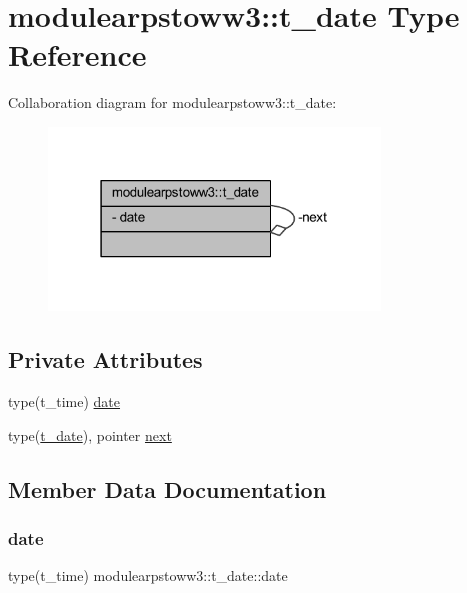\hypertarget{structmodulearpstoww3_1_1t__date}{}\section{modulearpstoww3\+:\+:t\+\_\+date Type Reference}
\label{structmodulearpstoww3_1_1t__date}


Collaboration diagram for modulearpstoww3\+:\+:t\+\_\+date\+:\nopagebreak
\begin{figure}[H]
\begin{center}
\leavevmode
\includegraphics[width=250pt]{structmodulearpstoww3_1_1t__date__coll__graph}
\end{center}
\end{figure}
\subsection*{Private Attributes}
\begin{DoxyCompactItemize}
\item 
type(t\+\_\+time) \mbox{\hyperlink{structmodulearpstoww3_1_1t__date_ac142c7c386935a83f8d28a473ccb10b4}{date}}
\item 
type(\mbox{\hyperlink{structmodulearpstoww3_1_1t__date}{t\+\_\+date}}), pointer \mbox{\hyperlink{structmodulearpstoww3_1_1t__date_a7fde8a6b10a67b80131929062cbbfcb6}{next}}
\end{DoxyCompactItemize}


\subsection{Member Data Documentation}
\mbox{\label{structmodulearpstoww3_1_1t__date_ac142c7c386935a83f8d28a473ccb10b4}} 
\subsubsection{\texorpdfstring{date}{date}}
{\footnotesize\ttfamily type(t\+\_\+time) modulearpstoww3\+::t\+\_\+date\+::date\hspace{0.3cm}{\ttfamily [private]}}

